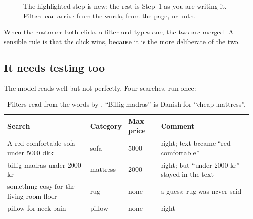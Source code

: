 \documentclass[11pt]{article}
\begin{document}
\begin{figure}[H]
\centering
{}
\caption{The highlighted step is new; the rest is Step~1 as you are
writing it. Filters can arrive from the words, from the page, or both.}
\label{fig:flow}
\end{figure}

When the customer both clicks a filter and types one, the two are
merged. A sensible rule is that the click wins, because it is the more
deliberate of the two.

\subsection{It needs testing too}

The model reads well but not perfectly. Four searches, run once:

\begin{table}[H]
\small
\begin{tabularx}{\textwidth}{@{}X l l X@{}}
\toprule
Search & Category & Max price & Comment \\
\midrule
A red comfortable sofa under 5000 dkk & sofa & 5000 &
  right; text became ``red comfortable'' \\
billig madras under 2000 kr & mattress & 2000 &
  right; but ``under 2000 kr'' stayed in the text \\
something cosy for the living room floor & rug & none &
  \textcolor{accent}{a guess: rug was never said} \\
pillow for neck pain & pillow & none & right \\
\bottomrule
\end{tabularx}
\caption{Filters read from the words by .
``Billig madras'' is Danish for ``cheap mattress''.}
\label{tab:extract}
\end{table}
\end{document}
